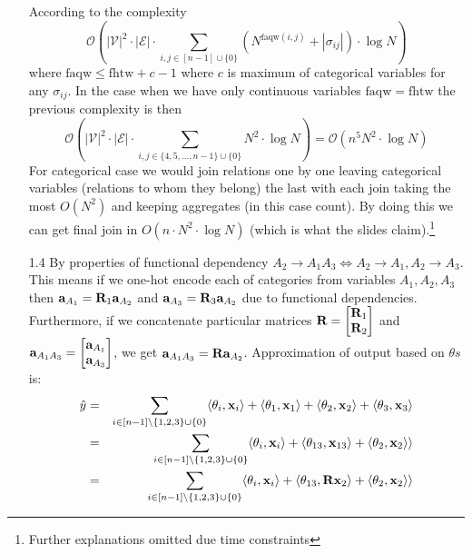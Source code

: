 \documentclass[10pt,a4paper]{article}
\begin{document}
\begin{enumerate}
\begin{itemize}
\end{itemize}
According to the \cite[page 7]{abo2018database}  complexity 
$$
\mathcal{O}\left(|\mathcal{V}|^{2} \cdot|\mathcal{E}| \cdot \sum_{i, j \in[n-1]\cup\{0\}}\left(N^{\mathrm{faqw}(i, j)}+\left|\sigma_{i j}\right|\right) \cdot \log N\right)
 $$
 where $ \mathrm{faqw} \leq \mathrm{fhtw} + c - 1$ where $c$ is maximum of categorical variables for any $\sigma_{ij}$. In the case when we have only continuous variables $\mathrm{faqw} =\mathrm{fhtw}$ the previous complexity is then 
 $$
\mathcal{O}\left(|\mathcal{V}|^{2} \cdot|\mathcal{E}| \cdot \sum_{i, j \in \{4, 5, ..., n-1\}\cup\{0\}}N^{\mathrm{2}}\cdot \log N\right) = \mathcal{O}\left(n^5 N^{\mathrm{2}}\cdot \log N\right)
 $$
 For categorical case we would join relations one by one leaving categorical variables (relations to whom they belong) the last with each join taking the most $O(N^2)$ and keeping aggregates (in this case count).  By doing this we can get final join in $O(n \cdot N^2 \cdot \log N)$ (which is what the slides claim).\footnote{Further explanations omitted due time constraints}
\item [1.4]
By properties of functional dependency $A_2 \rightarrow A_1A_3 \Leftrightarrow A_2 \rightarrow A_1, A_2\rightarrow A_3$. This means if we one-hot encode each of categories from variables $A_1, A_2, A_3$ then $\textbf{\text{{a}}}_{A_1} = \textbf{\text{{R}}}_1 \textbf{\text{{a}}}_{A_2}$ and $\textbf{\text{{a}}}_{A_3} = \textbf{\text{{R}}}_3 \textbf{\text{{a}}}_{A_2}$ due to functional dependencies. Furthermore, if we concatenate particular matrices $\textbf{\text{{R}}}= \begin{bmatrix}
\textbf{\text{{R}}}_1 \\
\textbf{\text{{R}}}_2
\end{bmatrix}
$  
and 
$\textbf{\text{{a}}}_{A_1A_3}= \begin{bmatrix}
\textbf{\text{{a}}}_{A_1} \\
\textbf{\text{{a}}}_{A_3}
\end{bmatrix}
$, we get $\textbf{\text{{a}}}_{A_1A_3}=\textbf{\text{{R}}}\textbf{\text{{a}}}_{A_2}$. Approximation of output based on $\theta s$ is:
\begin{eqnarray}
\hat{y} &=& 
\sum_{ i\in [n-1] \setminus \{ 1, 2,3 \} \cup \{0\}} \langle \theta_i, \vect{x}_i \rangle + \langle \theta_1 , \vect{x}_1 \rangle  + \langle \theta_2 , \vect{x}_2 \rangle + \langle \theta_3, \vect{x}_3 \rangle\\
&=&
\sum_{ i\in [n-1] \setminus \{ 1, 2,3 \} \cup \{0\}} \langle \theta_i, \vect{x}_i \rangle + \langle \theta_{13},\vect{x}_{13} \rangle  + \langle \theta_2, \vect{x}_2 \rangle \rangle\\
&=&
\sum_{ i\in [n-1] \setminus \{ 1, 2,3 \}\cup \{0\}} \langle \theta_i, \vect{x}_i \rangle + \langle \theta_{13},\mat{R} \vect{x}_2 \rangle  + \langle \theta_2 ,\vect{x}_2 \rangle \rangle\\

\end{eqnarray}
\end{enumerate}
\end{document}
